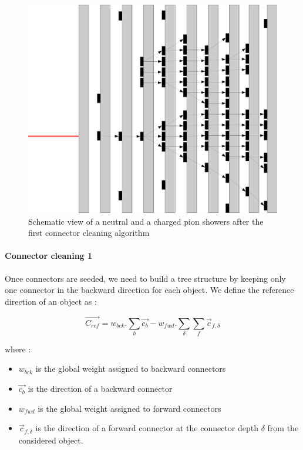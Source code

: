 \documentclass[cits]{JINST}
\begin{document}
\begin{figure}
  \vspace{-10pt}
  \begin{center}
    \includegraphics[width=\linewidth]{ConnectorCleaning1.pdf}
  \end{center}
  \vspace{10pt}
  \caption{\label{ARBOR_CONNECTOR_CLEANING_1} Schematic view of a neutral and a charged pion showers after the first connector cleaning algorithm}

\end{figure}

\paragraph*{Connector cleaning 1} Once connectors are seeded, we need to build a tree structure by keeping only one connector in the backward direction for each object. We define the reference direction of an object as :

\begin{equation}
  \vec{C_{ref}} = w_{bck} . \sum_b \vec{c_{b}} - w_{fwd} . \sum_\delta \sum_f \vec{c}_{f,\delta}
\end{equation}

where :

\begin{itemize}
  \item $w_{bck}$ is the global weight assigned to backward connectors
  \item $\vec{c_{b}}$ is the direction of a backward connector 
  \item $w_{fwd}$ is the global weight assigned to forward connectors
  \item $\vec{c}_{f,\delta}$ is the direction of a forward connector at the connector depth $\delta$ from the considered object.
\end{itemize}
\end{document}
